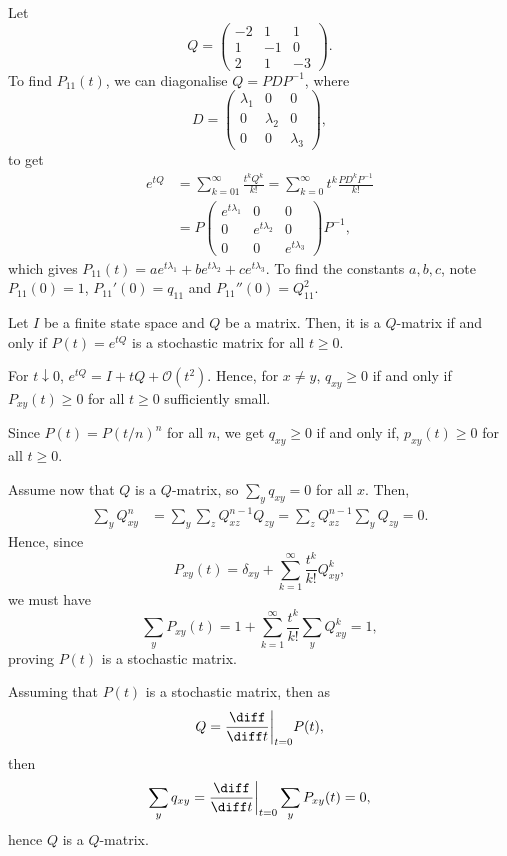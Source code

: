 \documentclass[12pt]{article}
\begin{document}
\begin{exbox}
	Let
	\[
	Q =
	\begin{pmatrix}
		-2 & 1 & 1 \\
		1 & -1 & 0 \\
		2 & 1 & -3
	\end{pmatrix}
	.\]
	To find $P_{11}(t)$, we can diagonalise $Q = PDP^{-1}$, where
	\[
	D =
	\begin{pmatrix}
		\lambda_1 & 0 & 0 \\
		0 & \lambda_2 & 0 \\
		0 & 0 & \lambda_3
	\end{pmatrix}
	,\]
	to get
	\begin{align*}
		e^{tQ} &= \sum_{k = 01}^{\infty} \frac{t^{k} Q^{k}}{k!} = \sum_{k = 0}^{\infty} t^{k} \frac{P D^{k} P^{-1}}{k!} \\
		       &= P 
		       \begin{pmatrix}
			       e^{t \lambda_1} & 0 & 0 \\
			       0 & e^{t \lambda_2} & 0 \\
			       0 & 0 & e^{t \lambda_3}
		       \end{pmatrix}
		       P^{-1},
	\end{align*}
	which gives $P_{11}(t) = a e^{t \lambda_1} + b e^{t \lambda_2} + c e^{t \lambda_3}$. To find the constants $a, b, c$, note $P_{11}(0) = 1$, $P_{11}'(0) = q_{11}$ and $P_{11}''(0) = Q^2_{11}$.
\end{exbox}

\begin{theorem}
	Let $I$ be a finite state space and $Q$ be a matrix. Then, it is a $Q$-matrix if and only if $P(t) = e^{tQ}$ is a stochastic matrix for all $t \geq 0$.
\end{theorem}

\begin{proofbox}
	For $t \downarrow 0$, $e^{tQ} = I + tQ + \mathcal{O}(t^2)$. Hence, for $x \neq y$, $q_{xy} \geq 0$ if and only if $P_{xy}(t) \geq 0$ for all $t \geq 0$ sufficiently small.

	Since $P(t) = P(t/n)^{n}$ for all $n$, we get $q_{xy} \geq 0$ if and only if, $p_{xy}(t) \geq 0$ for all $t \geq 0$.

	Assume now that $Q$ is a $Q$-matrix, so $\sum_y q_{xy} = 0$ for all $x$. Then,
	\begin{align*}
		\sum_y Q^{n}_{xy} &= \sum_y \sum_z Q^{n-1}_{xz} Q_{zy} = \sum_{z} Q^{n-1}_{xz} \sum_y Q_{zy} = 0.
	\end{align*}
	Hence, since
	\[
	P_{xy}(t) = \delta_{xy} + \sum_{k=1}^{\infty} \frac{t^{k}}{k!} Q^{k}_{xy}
	,\]
	we must have
	\[
	\sum_{y} P_{xy}(t) = 1 + \sum_{k = 1}^{\infty} \frac{t^{k}}{k!} \sum_y Q^{k}_{xy} = 1
	,\]
	proving $P(t)$ is a stochastic matrix.

	Assuming that $P(t)$ is a stochastic matrix, then as
	\[
	Q = \frac{\diff}{\diff t} \biggr|_{t = 0}P(t)
	,\]
	then
	\[
	\sum_y  q_{xy} = \frac{\diff}{\diff t}\biggr|_{t = 0} \sum_y P_{xy}(t) = 0
	,\]
	hence $Q$ is a $Q$-matrix.
\end{proofbox}
\end{document}
